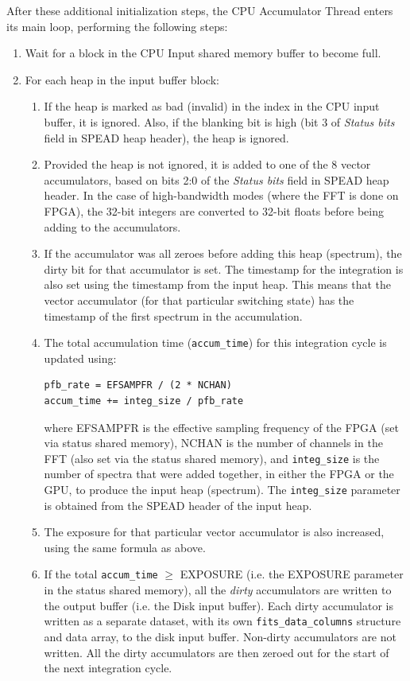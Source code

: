 \documentclass[11pt]{article} %
\begin{document}
After these additional initialization steps, the CPU Accumulator Thread enters its main loop, performing the following steps:

\begin{enumerate}

\item Wait for a block in the CPU Input shared memory buffer to become full.
\item For each heap in the input buffer block:

\begin{enumerate}
\item If the heap is marked as bad (invalid) in the index in the CPU input buffer, it is ignored. Also, if the blanking bit is high (bit 3 of \emph{Status bits} field in SPEAD heap header), the heap is ignored.
\item Provided the heap is not ignored, it is added to one of the 8 vector accumulators, based on bits 2:0 of the \emph{Status bits} field in SPEAD heap header. In the case of high-bandwidth modes (where the FFT is done on FPGA), the 32-bit integers are converted to 32-bit floats before being adding to the accumulators.
\item If the accumulator was all zeroes before adding this heap (spectrum), the dirty bit for that accumulator is set. The timestamp for the integration is also set using the timestamp from the input heap. This means that the vector accumulator (for that particular switching state) has the timestamp of the first spectrum in the accumulation.
\item The total accumulation time (\texttt{accum\_time}) for this integration cycle is updated using:
\begin{verbatim}
pfb_rate = EFSAMPFR / (2 * NCHAN)
accum_time += integ_size / pfb_rate
\end{verbatim}
where EFSAMPFR is the effective sampling frequency of the FPGA (set via status shared memory), NCHAN is the number of channels in the FFT (also set via the status shared memory), and \texttt{integ\_size} is the number of spectra that were added together, in either the FPGA or the GPU, to produce the input heap (spectrum). The \texttt{integ\_size} parameter is obtained from the SPEAD header of the input heap.
\item The exposure for that particular vector accumulator is also increased, using the same formula as above.
\item If the total \texttt{accum\_time} $\ge$ EXPOSURE (i.e. the EXPOSURE parameter in the status shared memory), all the {\em dirty} accumulators are written to the output buffer (i.e. the Disk input buffer). Each dirty accumulator is written as a separate dataset, with its own \texttt{fits\_data\_columns} structure and data array, to the disk input buffer. Non-dirty accumulators are not written. All the dirty accumulators are then zeroed out for the start of the next integration cycle.
\end{enumerate}


\end{enumerate}
\end{document}
